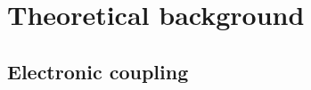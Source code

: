 \chapter{Theoretical background}
\label{sec:theory}





\section{Electronic coupling}
\label{sec:transfer_integrals}






